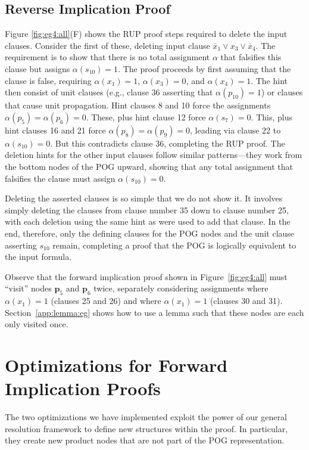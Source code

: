 \documentclass[letterpaper,USenglish,cleveref, autoref, thm-restate]{lipics-v2021}
\newcommand{\obar}[1]{\overline{#1}}
\newcommand{\assign}{\alpha}
\newcommand{\makenode}[1]{\mathbf{#1}}
\newcommand{\nodep}{\makenode{p}}
\begin{document}
\subsection{Reverse Implication Proof}

Figure \ref{fig:eg4:all}(F) shows the RUP proof steps required to
delete the input clauses.  Consider the first of these, deleting
input clause $\obar{x}_1 \lor x_3 \lor \obar{x}_4$.  The requirement is to show
that there is no total assignment $\assign$ that falsifies this clause but assigns $\assign(s_{10}) = 1$.
The proof proceeds by first assuming that the clause is false, requiring
$\assign(x_1) = 1$, $\assign(x_3) = 0$, and $\assign(x_4) = 1$.  The hint then consist of unit
clauses (e.g., clause 36 asserting that $\alpha(p_{10}) = 1$) or
clauses that cause unit propagation.  Hint clauses 8 and 10 force the
assignments $\assign(p_5) = \assign(p_6) = 0$.  These, plus hint clause 12 force
$\assign(s_7) = 0$.  This, plus hint clauses 16 and 21 force $\assign(p_8) = \assign(p_9) = 0$, leading
via clause 22 to $\assign(s_{10}) = 0$.  But this contradicts clause 36,
completing the RUP proof.  The deletion hints for the other input
clauses follow similar patterns---they work from the bottom nodes of
the POG upward, showing that any total assignment that falsifies the clause
must assign $\assign(s_{10}) = 0$.

Deleting the asserted clauses is so simple that we do not show it.  It
involves simply deleting the clauses from clause number 35 down to
clause number 25, with each deletion using the same hint as were used
to add that clause.  In the end, therefore, only the defining clauses
for the POG nodes and the unit clause asserting $s_{10}$ remain,
completing a proof that the POG is logically equivalent to the input
formula.

Observe that the forward implication proof shown in Figure~\ref{fig:eg4:all}  must ``visit'' nodes
$\nodep_5$ and $\nodep_6$ twice, separately considering  assignments where $\assign(x_1) = 1$
(clauses 25 and 26) and where $\assign(x_1) = 1$ (clauses 30 and 31).
Section~\ref{app:lemma:eg} shows how to use a lemma such that these nodes are each only visited once.


\section{Optimizations for Forward Implication Proofs}

The two optimizations we have implemented exploit the power of our
general resolution framework to define new structures within the
proof. In particular, they create new product nodes that are not part
of the POG representation.
\end{document}
